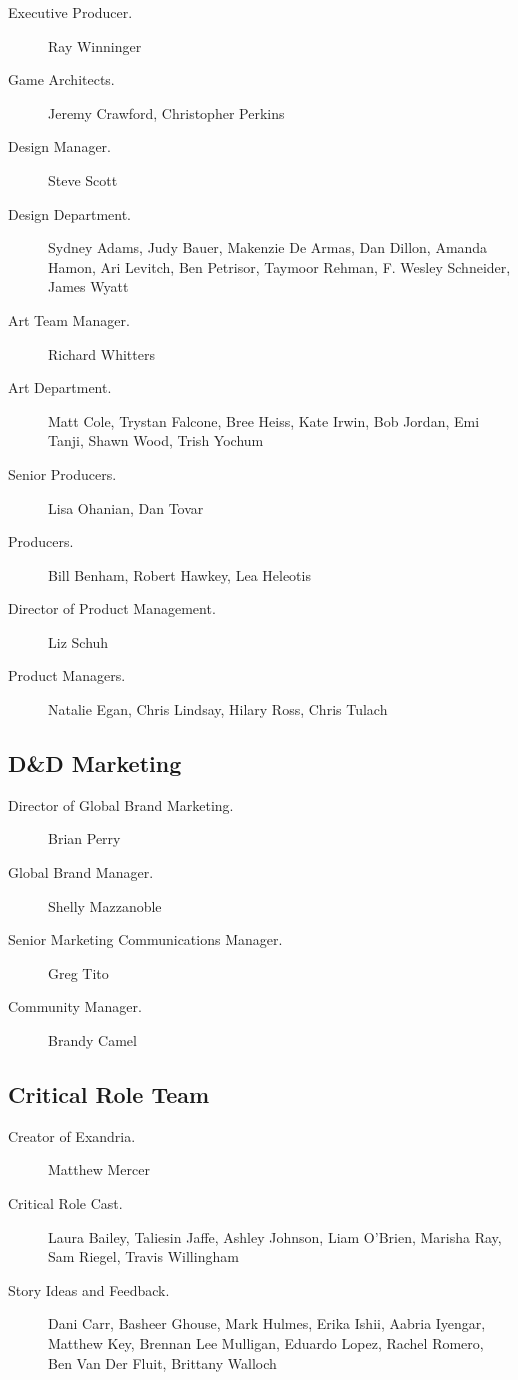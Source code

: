 \documentclass[a4paper, 11pt, bg=full, twocolumn, nooutline]{dndbook}
\begin{document}
\begin{description}
\begin{description}
\item[Executive Producer.] Ray Winninger
\item[Game Architects.] Jeremy Crawford, Christopher Perkins
\item[Design Manager.] Steve Scott
\item[Design Department.] Sydney Adams, Judy Bauer, Makenzie De Armas, Dan Dillon, Amanda Hamon, Ari Levitch, Ben Petrisor, Taymoor Rehman, F. Wesley Schneider, James Wyatt
\item[Art Team Manager.] Richard Whitters
\item[Art Department.] Matt Cole, Trystan Falcone, Bree Heiss, Kate Irwin, Bob Jordan, Emi Tanji, Shawn Wood, Trish Yochum
\item[Senior Producers.] Lisa Ohanian, Dan Tovar
\item[Producers.] Bill Benham, Robert Hawkey, Lea Heleotis
\item[Director of Product Management.] Liz Schuh
\item[Product Managers.] Natalie Egan, Chris Lindsay, Hilary Ross, Chris Tulach
\end{description}
\item[\mbox{}] \subsection{D\&D Marketing}

\begin{description}
\item[Director of Global Brand Marketing.] Brian Perry
\item[Global Brand Manager.] Shelly Mazzanoble
\item[Senior Marketing Communications Manager.] Greg Tito
\item[Community Manager.] Brandy Camel
\end{description}
\item[\mbox{}] \subsection{Critical Role Team}

\begin{description}
\item[Creator of Exandria.] Matthew Mercer
\item[Critical Role Cast.] Laura Bailey, Taliesin Jaffe, Ashley Johnson, Liam O'Brien, Marisha Ray, Sam Riegel, Travis Willingham
\item[Story Ideas and Feedback.] Dani Carr, Basheer Ghouse, Mark Hulmes, Erika Ishii, Aabria Iyengar, Matthew Key, Brennan Lee Mulligan, Eduardo Lopez, Rachel Romero, Ben Van Der Fluit, Brittany Walloch
\end{description}
\end{description}
\end{document}

